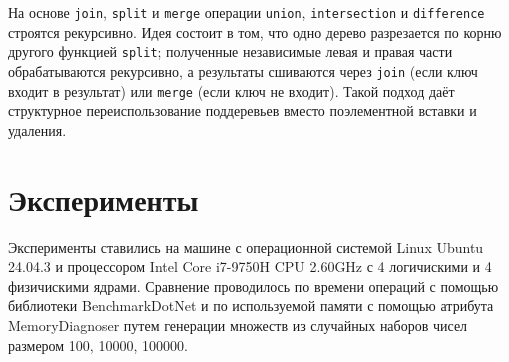 \documentclass[a4paper]{article}
\begin{document}
На основе \texttt{join}, \texttt{split} и \texttt{merge} операции
\texttt{union}, \texttt{intersection} и \texttt{difference} строятся
рекурсивно. Идея состоит в том, что одно дерево разрезается по корню другого
функцией \texttt{split}; полученные независимые левая и правая части
обрабатываются рекурсивно, а результаты сшиваются через \texttt{join} (если
ключ входит в результат) или \texttt{merge} (если ключ не входит). Такой подход
даёт структурное переиспользование поддеревьев вместо поэлементной
вставки и удаления.


\section{Эксперименты}

Эксперименты ставились на машине с операционной системой Linux Ubuntu 24.04.3 и процессором Intel Core i7-9750H CPU 2.60GHz с 4 логичискими 
и 4 физичискими ядрами.
Сравнение проводилось по времени операций с помощью библиотеки BenchmarkDotNet и по используемой памяти с помощью атрибута MemoryDiagnoser путем 
генерации множеств из случайных наборов чисел размером 100, 10000, 100000.
\end{document}
